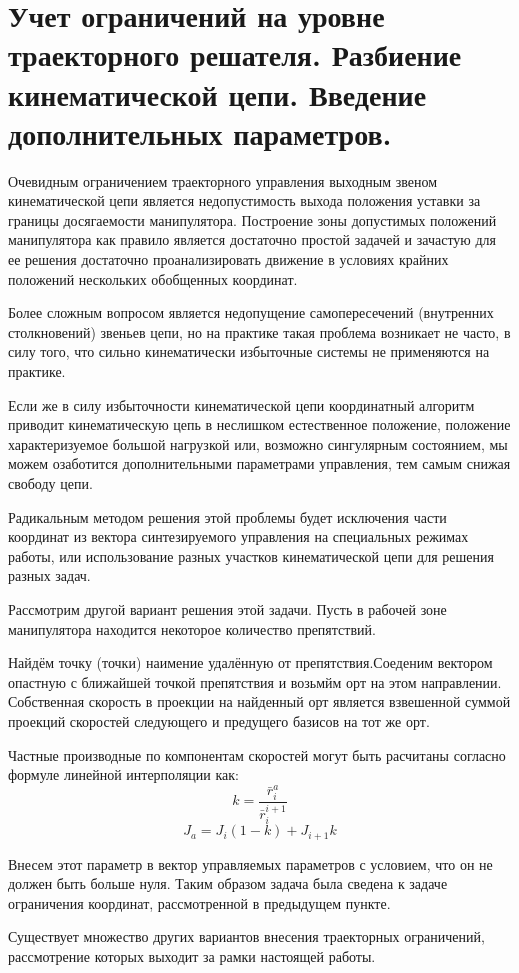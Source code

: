 \section{Учет ограничений на уровне траекторного решателя. Разбиение кинематической цепи. Введение дополнительных параметров.}\label{restr_traj}

Очевидным ограничением траекторного управления выходным звеном кинематической цепи является недопустимость выхода положения уставки за границы досягаемости манипулятора. Построение зоны допустимых положений манипулятора как правило является достаточно простой задачей и зачастую для ее решения достаточно проанализировать движение в условиях крайних положений нескольких обобщенных координат.

Более сложным вопросом является недопущение самопересечений (внутренних столкновений) звеньев цепи, но на практике такая проблема возникает не часто, в силу того, что сильно кинематически избыточные системы не применяются на практике.

Если же в силу избыточности кинематической цепи координатный алгоритм приводит кинематическую цепь в неслишком естественное положение, положение характеризуемое большой нагрузкой или, возможно сингулярным состоянием, мы можем озаботится дополнительными параметрами управления, тем самым снижая свободу цепи. 

Радикальным методом решения этой проблемы будет исключения части координат из вектора синтезируемого управления на специальных режимах работы, или использование разных участков кинематической цепи для решения разных задач. 

Рассмотрим другой вариант решения этой задачи. Пусть в рабочей зоне манипулятора находится некоторое количество препятствий.

Найдём точку (точки) наимение удалённую от препятствия.Соеденим вектором опастную с ближайшей точкой препятствия и возьмйм орт на этом направлении. Собственная скорость в проекции на найденный орт является взвешенной суммой проекций скоростей следующего и предущего базисов на тот же орт.

Частные производные по компонентам скоростей могут быть расчитаны согласно формуле линейной интерполяции как:
\begin{equation}
k = \frac{\bar{r}_i^a}{\bar{r}_i^{i+1}} 
\end{equation}
\begin{equation}
J_a = J_i (1-k) + J_{i+1} k
\end{equation}

Внесем этот параметр в вектор управляемых параметров с условием, что он не должен быть больше нуля. Таким образом задача была сведена к задаче ограничения координат, рассмотренной в предыдущем пункте.

Существует множество других вариантов внесения траекторных ограничений, рассмотрение которых выходит за рамки настоящей работы.
